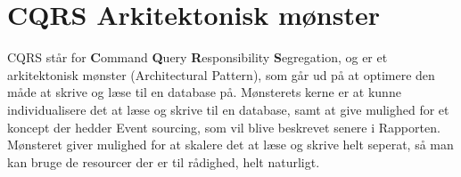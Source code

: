 \chapter{CQRS Arkitektonisk mønster}

CQRS står for \textbf{C}ommand \textbf{Q}uery \textbf{R}esponsibility \textbf{S}egregation, og er et arkitektonisk mønster (Architectural Pattern), som går ud på at optimere den måde at skrive og læse til en database på. Mønsterets kerne er at kunne individualisere det at læse og skrive til en database, samt at give mulighed for et koncept der hedder Event sourcing, som vil blive beskrevet senere i Rapporten. Mønsteret giver mulighed for at skalere det at læse og skrive helt seperat, så man kan bruge de resourcer der er til rådighed, helt naturligt.
